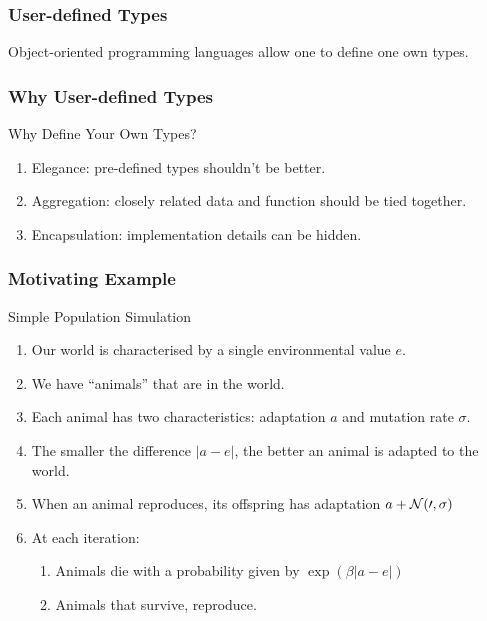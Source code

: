 \begin{frame}[fragile] %
\frametitle{User-defined Types}

Object-oriented programming languages allow one to define one own types.

\end{frame}

\begin{frame}[fragile] %
\frametitle{Why User-defined Types}

\begin{block}{Why Define Your Own Types?}
\begin{enumerate}
\item Elegance: pre-defined types shouldn't be better.
\item Aggregation: closely related data and function should be tied together.
\item Encapsulation: implementation details can be hidden.
\end{enumerate}
\end{block}

\end{frame}

\begin{frame}[fragile] %
\frametitle{Motivating Example}
\begin{block}{Simple Population Simulation}
\begin{enumerate}
\item Our world is characterised by a single environmental value $e$.
\item We have ``animals'' that are in the world.
\item Each animal has two characteristics: adaptation $a$ and mutation rate $\sigma$.
\item The smaller the difference $|a-e|$, the better an animal is adapted to the world.
\item When an animal reproduces, its offspring has adaptation $a + \cal{N}(0,\sigma)$
\item At each iteration:
\begin{enumerate}
\item Animals die with a probability given by $\exp(\beta|a-e|)$
\item Animals that survive, reproduce.
\end{enumerate}
\end{enumerate}
\end{block}

\end{frame}

